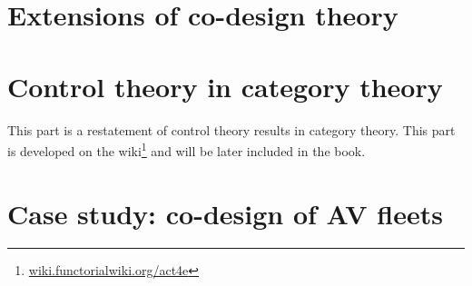{\chapter{}

\clearpage

\chapter{}

\clearpage


\part{ Extensions of co-design theory}


\chapter{}


}



\part{Control theory in category theory}

This part is a restatement of control theory results in category theory.
This part is developed on the wiki\footnote{\href{https://wiki.functorialwiki.org/act4e/}{wiki.functorialwiki.org/act4e}} and will be later included in the book.



\part{Case study: co-design of AV fleets}

%
%
%
%
\printbibliography